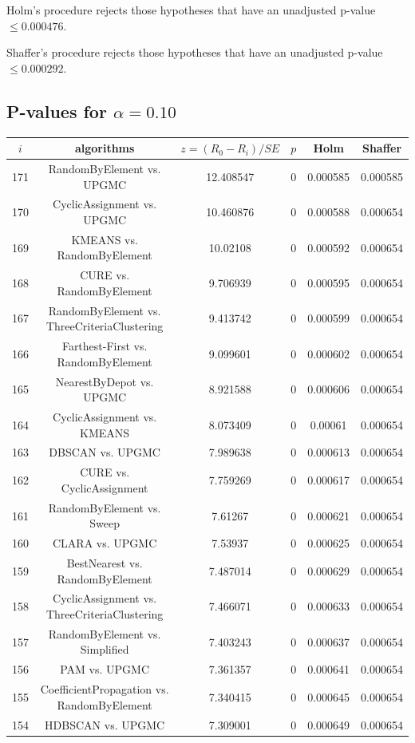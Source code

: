 \documentclass[a4paper,10pt]{article}
\begin{document}
\begin{landscape}
Holm's procedure rejects those hypotheses that have an unadjusted p-value $\le0.000476$.

Shaffer's procedure rejects those hypotheses that have an unadjusted p-value $\le0.000292$.

\pagebreak

\subsection{P-values for $\alpha=0.10$}

\begin{table}[!htp]
\centering\scriptsize
\begin{tabular}{cccccc}
$i$&algorithms&$z=(R_0 - R_i)/SE$&$p$&Holm&Shaffer\\
\hline171&RandomByElement vs. UPGMC&12.408547&0&0.000585&0.000585\\
170&CyclicAssignment vs. UPGMC&10.460876&0&0.000588&0.000654\\
169&KMEANS vs. RandomByElement&10.02108&0&0.000592&0.000654\\
168&CURE vs. RandomByElement&9.706939&0&0.000595&0.000654\\
167&RandomByElement vs. ThreeCriteriaClustering&9.413742&0&0.000599&0.000654\\
166&Farthest-First vs. RandomByElement&9.099601&0&0.000602&0.000654\\
165&NearestByDepot vs. UPGMC&8.921588&0&0.000606&0.000654\\
164&CyclicAssignment vs. KMEANS&8.073409&0&0.00061&0.000654\\
163&DBSCAN vs. UPGMC&7.989638&0&0.000613&0.000654\\
162&CURE vs. CyclicAssignment&7.759269&0&0.000617&0.000654\\
161&RandomByElement vs. Sweep&7.61267&0&0.000621&0.000654\\
160&CLARA vs. UPGMC&7.53937&0&0.000625&0.000654\\
159&BestNearest vs. RandomByElement&7.487014&0&0.000629&0.000654\\
158&CyclicAssignment vs. ThreeCriteriaClustering&7.466071&0&0.000633&0.000654\\
157&RandomByElement vs. Simplified&7.403243&0&0.000637&0.000654\\
156&PAM vs. UPGMC&7.361357&0&0.000641&0.000654\\
155&CoefficientPropagation vs. RandomByElement&7.340415&0&0.000645&0.000654\\
154&HDBSCAN vs. UPGMC&7.309001&0&0.000649&0.000654\\

\end{tabular}
\end{table}
\end{landscape}
\end{document}
